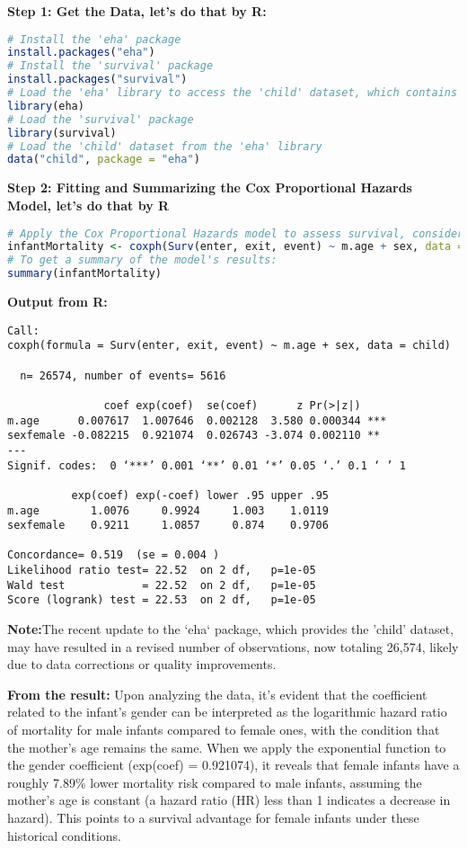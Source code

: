 \documentclass[12pt,letterpaper]{article}
\begin{document}
\textbf{Step 1: Get the Data, let's do that by R:}
\begin{lstlisting}[language=R]
# Install the 'eha' package
install.packages("eha")
# Install the 'survival' package
install.packages("survival")
# Load the 'eha' library to access the 'child' dataset, which contains information on child mortality influenced by the mother's background and the child's sex
library(eha)
# Load the 'survival' package
library(survival)
# Load the 'child' dataset from the 'eha' library
data("child", package = "eha")
\end{lstlisting}
\textbf{Step 2: Fitting and Summarizing the Cox Proportional Hazards Model, let's do that by R}
\begin{lstlisting}[language=R]
# Apply the Cox Proportional Hazards model to assess survival, considering factors such as the mother's age and the child's sex
infantMortality <- coxph(Surv(enter, exit, event) ~ m.age + sex, data = child)
# To get a summary of the model's results:
summary(infantMortality)
\end{lstlisting}
\textbf{Output from R:}
\begin{verbatim}
Call:
coxph(formula = Surv(enter, exit, event) ~ m.age + sex, data = child)

  n= 26574, number of events= 5616 

               coef exp(coef)  se(coef)      z Pr(>|z|)    
m.age      0.007617  1.007646  0.002128  3.580 0.000344 ***
sexfemale -0.082215  0.921074  0.026743 -3.074 0.002110 ** 
---
Signif. codes:  0 ‘***’ 0.001 ‘**’ 0.01 ‘*’ 0.05 ‘.’ 0.1 ‘ ’ 1

          exp(coef) exp(-coef) lower .95 upper .95
m.age        1.0076     0.9924     1.003    1.0119
sexfemale    0.9211     1.0857     0.874    0.9706

Concordance= 0.519  (se = 0.004 )
Likelihood ratio test= 22.52  on 2 df,   p=1e-05
Wald test            = 22.52  on 2 df,   p=1e-05
Score (logrank) test = 22.53  on 2 df,   p=1e-05
\end{verbatim}

\textbf{Note:}The recent update to the `eha` package, which provides the 'child' dataset, may have resulted in a revised number of observations, now totaling 26,574, likely due to data corrections or quality improvements.

\textbf{From the result:}
Upon analyzing the data, it's evident that the coefficient related to the infant's gender can be interpreted as the logarithmic hazard ratio of mortality for male infants compared to female ones, with the condition that the mother's age remains the same. When we apply the exponential function to the gender coefficient (exp(coef) = 0.921074), it reveals that female infants have a roughly 7.89\% lower mortality risk compared to male infants, assuming the mother's age is constant (a hazard ratio (HR) less than 1 indicates a decrease in hazard). This points to a survival advantage for female infants under these historical conditions.
\end{document}
